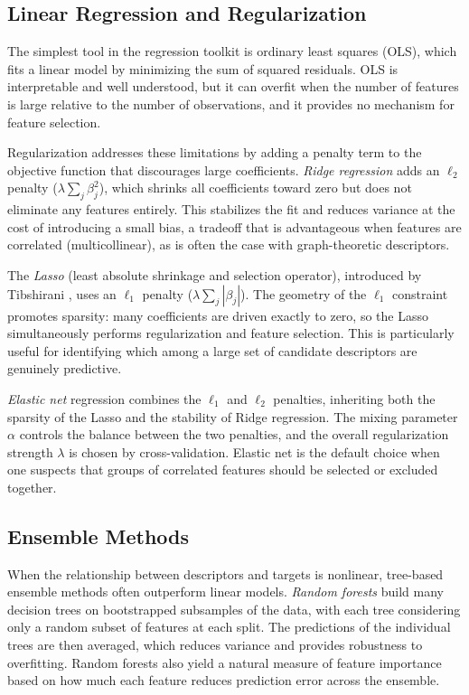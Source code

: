 \subsection{Linear Regression and Regularization}

The simplest tool in the regression toolkit is ordinary least squares (OLS),
which fits a linear model by minimizing the sum of squared residuals. OLS is
interpretable and well understood, but it can overfit when the number of
features is large relative to the number of observations, and it provides no
mechanism for feature selection.

Regularization addresses these limitations by adding a penalty term to the
objective function that discourages large coefficients. \emph{Ridge regression}
\cite{HoerlKennard1970Ridge} adds an $\ell_2$ penalty
($\lambda \sum_j \beta_j^2$), which shrinks all coefficients toward zero but
does not eliminate any features entirely. This stabilizes the fit and reduces
variance at the cost of introducing a small bias, a tradeoff that is
advantageous when features are correlated (multicollinear), as is often the
case with graph-theoretic descriptors.

The \emph{Lasso} (least absolute shrinkage and selection operator), introduced
by Tibshirani \cite{Tibshirani1996Lasso}, uses an $\ell_1$ penalty
($\lambda \sum_j |\beta_j|$). The geometry of the $\ell_1$ constraint promotes
sparsity: many coefficients are driven exactly to zero, so the Lasso
simultaneously performs regularization and feature selection. This is
particularly useful for identifying which among a large set of candidate
descriptors are genuinely predictive.

\emph{Elastic net} regression \cite{ZouHastie2005ElasticNet} combines the
$\ell_1$ and $\ell_2$ penalties, inheriting both the sparsity of the Lasso
and the stability of Ridge regression. The mixing parameter $\alpha$ controls
the balance between the two penalties, and the overall regularization strength
$\lambda$ is chosen by cross-validation. Elastic net is the default choice
when one suspects that groups of correlated features should be selected or
excluded together.

\subsection{Ensemble Methods}

When the relationship between descriptors and targets is nonlinear, tree-based
ensemble methods often outperform linear models. \emph{Random forests}
\cite{Breiman2001RandomForests} build many decision trees on bootstrapped
subsamples of the data, with each tree considering only a random subset of
features at each split. The predictions of the individual trees are then
averaged, which reduces variance and provides robustness to overfitting. Random
forests also yield a natural measure of feature importance based on how much
each feature reduces prediction error across the ensemble.

